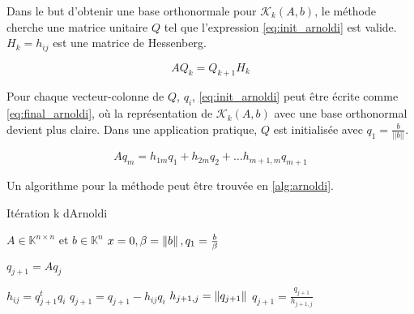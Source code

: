     Dans le but d'obtenir une base orthonormale pour $\mathcal{K}_{k}(A,b)$, le méthode cherche une matrice unitaire $Q$ tel que l'expression \ref{eq:init_arnoldi} est valide. $H_{k}={h_{ij}}$ est une matrice de Hessenberg.

    \begin{equation} \label{eq:init_arnoldi}
        AQ_{k} = Q_{k+1}H_{k}
    \end{equation} 

    Pour chaque vecteur-colonne de $Q$, $q_{i}$, \ref{eq:init_arnoldi} peut être écrite comme \ref{eq:final_arnoldi}, où la représentation de $\mathcal{K}_{k}(A,b)$ avec une base orthonormal devient plus claire. Dans une application pratique, $Q$ est initialisée avec $q_{1} = \frac{b}{||b||}$.

    \begin{equation}\label{eq:final_arnoldi}
        Aq_{m} = h_{1m}q_{1} + h_{2m}q_{2} + \dots h_{m+1,m}q_{m+1}
    \end{equation}

    Un algorithme pour la méthode peut être trouvée en \ref{alg:arnoldi}.

     \begin{algorithm}
    \caption{Itération k dArnoldi}\label{alg:arnoldi}
    \begin{algorithmic}[1]
    \State $A \in \mathbb{K}^{n \times n}$ et $b\in \mathbb{K}^{n}$
    \State $x=0, \beta=\left\lVert b\right\rVert,q_{1}=\frac{b}{\beta}$
    
    \State $q_{j+1} = Aq_{j}$

    \State $h_{ij}= q_{j+1}^{t}q_{i}$
    \State $q_{j+1} = q_{j+1} - h_{ij}q_{i}$
    \EndFor
    \State $h_{j+1,j}=\left\lVert q_{j+1}\right\rVert$
    \State $q_{j+1} = \frac{q_{j+1}}{h_{j+1,j}}$
    \EndFor
    
    \end{algorithmic}
    \end{algorithm}
